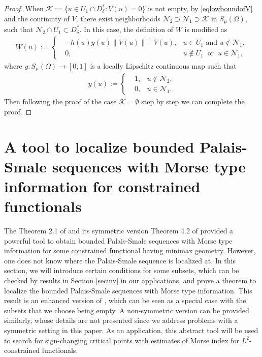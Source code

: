\documentclass[10pt,a4paper]{article}
\theoremstyle{definition} \theoremstyle{remark}
\numberwithin{equation}{section}
\newcommand{\K}{\mathcal{K}}
\begin{document}
\begin{proof}
    When $\K := \{u \in U_1 \cap D_\delta^*: V(u) = 0\}$ is not empty, by \eqref{eqlowboundofV} and the continuity of $V$, there exist neighborhoods $\mathcal{N}_2 \supset \mathcal{N}_1 \supset \K$ in $S_\mu(\Omega)$, such that $\mathcal{N}_2 \cap U_1 \subset D_\delta^*$. In this case, the definition of $W$ is modified as
    \begin{align*}
    	W(u) :=
    	\left\{
    	\begin{aligned}
    		& -h(u)y(u)\|V(u)\|^{-1}V(u), & u \in U_1 \text{ and } u \notin \mathcal{N}_1, \\
    		& 0, & u \notin U_1 \ \text{ or } \ u \in \mathcal{N}_1,
    	\end{aligned}
    	\right.
    \end{align*}
    where $y : S_\mu(\Omega) \to [0,1]$ is a locally Lipschitz continuous map such that
    \begin{align*}
    	y(u) :=
    	\left\{
    	\begin{aligned}
    		& 1, & u \notin \mathcal{N}_2, \\
    		& 0, & u \in \mathcal{N}_1.
    	\end{aligned}
    	\right.
    \end{align*}
    Then following the proof of the case $\K = \emptyset$ step by step we can complete the proof.
\end{proof}


\section{A tool to localize bounded Palais-Smale sequences with Morse type information for constrained functionals} \label{sectool}

 The Theorem 2.1 of \cite{BCJN} and its symmetric version Theorem 4.2  of \cite{BCJN} provided a powerful tool to obtain bounded Palais-Smale sequences with Morse type information for some constrained functional having minimax geometry. However, one does not know where the Palais-Smale sequence is localized at. In this section, we will introduce certain conditions for some subsets, which can be checked by results in Section \ref{secinv} in our applications, and prove a theorem to localize the bounded Palais-Smale sequences with Morse type information. This result is an enhanced version of \cite[Theorem 4.2]{BCJN}, which can be seen as a special case with the subsets that we choose being empty. A non-symmetric version can be provided similarly, whose details are not presented since we address problems with a symmetric setting in this paper. As an application, this abstract tool will be used to search for sign-changing critical points with estimates of Morse index for $L^2$-constrained functionals.
\end{document}
